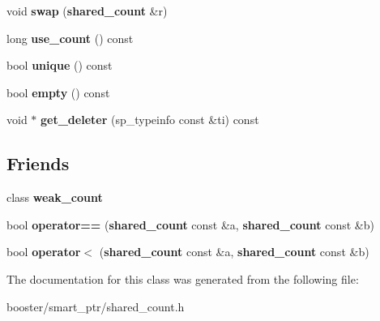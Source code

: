 \begin{DoxyCompactItemize}
\item 
void {\bfseries swap} ({\bf shared\+\_\+count} \&r)\label{classbooster_1_1detail_1_1shared__count_af3626fdb2cfe76d0d6118064db95c2dd}

\item 
long {\bfseries use\+\_\+count} () const \label{classbooster_1_1detail_1_1shared__count_a43820697b7614ecaa0fea25a2ededd79}

\item 
bool {\bfseries unique} () const \label{classbooster_1_1detail_1_1shared__count_adf17c934b1bc1260c0ea7d04056cd7c4}

\item 
bool {\bfseries empty} () const \label{classbooster_1_1detail_1_1shared__count_a17fc5656ef9befe883837f8566124246}

\item 
void $\ast$ {\bfseries get\+\_\+deleter} (sp\+\_\+typeinfo const \&ti) const \label{classbooster_1_1detail_1_1shared__count_a92f2ed9d04dba29eb71e71ed5960cd8e}

\end{DoxyCompactItemize}
\subsection*{Friends}
\begin{DoxyCompactItemize}
\item 
class {\bfseries weak\+\_\+count}\label{classbooster_1_1detail_1_1shared__count_a52546549a7fd30c6519bbed0aa62423a}

\item 
bool {\bfseries operator==} ({\bf shared\+\_\+count} const \&a, {\bf shared\+\_\+count} const \&b)\label{classbooster_1_1detail_1_1shared__count_aef780234c6f1b295c4cd4bc78268081a}

\item 
bool {\bfseries operator$<$} ({\bf shared\+\_\+count} const \&a, {\bf shared\+\_\+count} const \&b)\label{classbooster_1_1detail_1_1shared__count_afb9b6fff363ab72cfaa7f3af7518c21b}

\end{DoxyCompactItemize}


The documentation for this class was generated from the following file\+:\begin{DoxyCompactItemize}
\item 
booster/smart\+\_\+ptr/shared\+\_\+count.\+h\end{DoxyCompactItemize}
